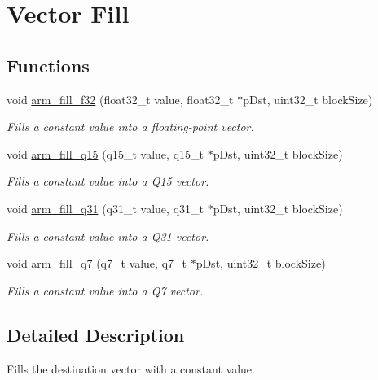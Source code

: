 \hypertarget{group___fill}{\section{Vector Fill}
\label{group___fill}
}
\subsection*{Functions}
\begin{DoxyCompactItemize}
\item 
void \hyperlink{group___fill_ga2248e8d3901b4afb7827163132baad94}{arm\-\_\-fill\-\_\-f32} (float32\-\_\-t value, float32\-\_\-t $\ast$p\-Dst, uint32\-\_\-t block\-Size)
\begin{DoxyCompactList}\small\item\em Fills a constant value into a floating-\/point vector. \end{DoxyCompactList}\item 
void \hyperlink{group___fill_ga76b21c32a3783a2b3334d930a646e5d8}{arm\-\_\-fill\-\_\-q15} (q15\-\_\-t value, q15\-\_\-t $\ast$p\-Dst, uint32\-\_\-t block\-Size)
\begin{DoxyCompactList}\small\item\em Fills a constant value into a Q15 vector. \end{DoxyCompactList}\item 
void \hyperlink{group___fill_ga69cc781cf337bd0a31bb85c772a35f7f}{arm\-\_\-fill\-\_\-q31} (q31\-\_\-t value, q31\-\_\-t $\ast$p\-Dst, uint32\-\_\-t block\-Size)
\begin{DoxyCompactList}\small\item\em Fills a constant value into a Q31 vector. \end{DoxyCompactList}\item 
void \hyperlink{group___fill_ga0465cf326ada039ed792f94b033d9ec5}{arm\-\_\-fill\-\_\-q7} (q7\-\_\-t value, q7\-\_\-t $\ast$p\-Dst, uint32\-\_\-t block\-Size)
\begin{DoxyCompactList}\small\item\em Fills a constant value into a Q7 vector. \end{DoxyCompactList}\end{DoxyCompactItemize}


\subsection{Detailed Description}
Fills the destination vector with a constant value.


